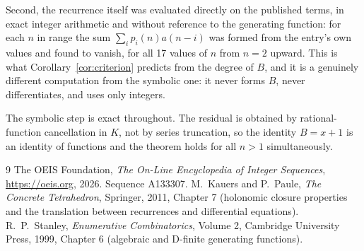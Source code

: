 \documentclass[11pt,a4paper]{article}
\theoremstyle{plain}
\theoremstyle{definition}
\begin{document}
Second, the recurrence itself was evaluated directly on the published terms, in exact
integer arithmetic and without reference to the generating function: for each $n$ in range
the sum $\sum_{i}p_{i}(n)a(n-i)$ was formed from the entry's own values and found to
vanish, for all 17 values of $n$ from $n=2$ upward. This is what
Corollary~\ref{cor:criterion} predicts from the degree of $B$, and it is a genuinely
different computation from the symbolic one: it never forms $B$, never differentiates, and
uses only integers.

The symbolic step is exact throughout. The residual is obtained by rational-function
cancellation in $K$, not by series truncation, so the identity $B=x + 1$ is an
identity of functions and the theorem holds for all $n>1$ simultaneously.

\begin{thebibliography}{9}
 The OEIS Foundation, \emph{The On-Line Encyclopedia of Integer Sequences},
\url{https://oeis.org}, 2026. Sequence A133307.
 M.~Kauers and P.~Paule, \emph{The Concrete Tetrahedron}, Springer, 2011,
Chapter 7 (holonomic closure properties and the translation between recurrences and
differential equations).
 R.~P.~Stanley, \emph{Enumerative Combinatorics}, Volume 2, Cambridge
University Press, 1999, Chapter 6 (algebraic and D-finite generating functions).
\end{thebibliography}
\end{document}
